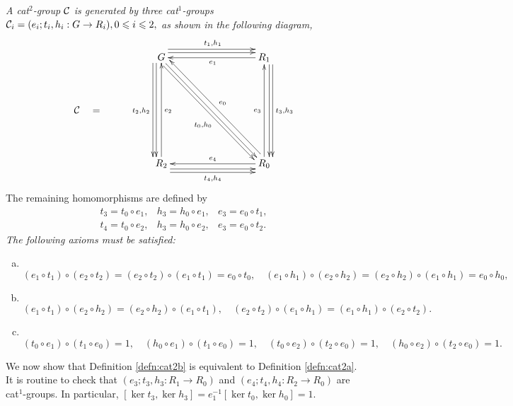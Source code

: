 \begin{defn} \label{defn:cat2b} 
\emph{A cat$^2$-group  $\mathcal{C}$ is generated by three cat$^1$-groups 
$\mathcal{C}_i = (e_i;t_i,h_i : G \to R_i), 0 \leqslant i \leqslant 2,$ 
as shown in the following diagram,}
\begin{equation} \label{eq:cat2-diag-b}
\vcenter{\xymatrix@R=40pt@C=40pt{
 & G \ar[dd] <-1.2ex>  \ar[dd] <-2.0ex>_{t_2,h_2}
     \ar[rr] <+1.2ex>  \ar[rr] <+2.0ex>^{t_1,h_1}
     \ar[ddrr] <-0.2ex>  \ar[ddrr] <-1.0ex>_(0.55){t_0,h_0}
    &&  R_1  \ar[ll]^{e_1}
             \ar[dd]<+1.2ex>  \ar[dd] <+2.0ex>^{t_3,h_3} \\ 
\calC \quad = \quad \\
 & R_2 \ar[uu]_{e_2}
     \ar[rr] <-1.2ex>  \ar[rr] <-2.0ex>_{t_4,h_4} 
    &&  R_0 \ar[uu]^{e_3}  \ar[ll]_{e_4}  \ar[uull] <-1.0ex>_{e_0}
 \\
}}
\end{equation}
\noindent 
The remaining homomorphisms are defined by 
\begin{eqnarray*} 
t_3 = t_0 \circ e_1,  
  &  h_3 = h_0 \circ e_1, 
     &  e_3 = e_0 \circ t_1, \\ 
t_4 = t_0 \circ e_2,  
  &  h_3 = h_0 \circ e_2, 
     &  e_3 = e_0 \circ t_2. 
\end{eqnarray*} 
\noindent 
\emph{The following axioms must be satisfied:} 
\begin{enumerate}[(a)]
\item~ 
$
(e_1 \circ t_1) \circ (e_2 \circ t_2) 
= (e_2 \circ t_2) \circ (e_1 \circ t_1) 
= e_0 \circ t_0, \quad
(e_1 \circ h_1) \circ (e_2 \circ h_2) 
= (e_2 \circ h_2) \circ (e_1 \circ h_1) 
= e_0 \circ h_0, 
$
\item~ 
$
(e_1 \circ t_1) \circ (e_2 \circ h_2) = (e_2 \circ h_2) \circ (e_1 \circ t_1), \quad 
(e_2 \circ t_2) \circ (e_1 \circ h_1) = (e_1 \circ h_1) \circ (e_2 \circ t_2). 
$
\item~ 
$
(t_0 \circ e_1) \circ (t_1 \circ e_0) = 1, \quad 
(h_0 \circ e_1) \circ (t_1 \circ e_0) = 1, \quad  
(t_0 \circ e_2) \circ (t_2 \circ e_0) = 1, \quad 
(h_0 \circ e_2) \circ (t_2 \circ e_0) = 1. 
$
\end{enumerate}
\end{defn} 

We now show that Definition \ref{defn:cat2b} is equivalent to 
Definition \ref{defn:cat2a}. 
It is routine to check that 
$(e_3;t_3,h_3 : R_1 \to R_0)$ and $(e_4;t_4,h_4 : R_2 \to R_0)$
are cat$^1$-groups. 
In particular, $[\ker t_3, \ker h_3] = e_1^{-1}[\ker t_0, \ker h_0] = 1$. 

